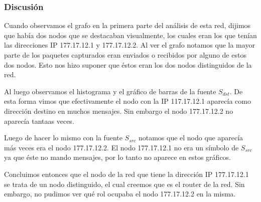 \subsubsection{Discusión}

Cuando observamos el grafo en la primera parte del análisis de esta red, dijimos que había dos nodos que se destacaban visualmente, los cuales eran los que tenían las direcciones IP 177.17.12.1 y 177.17.12.2. Al ver el grafo notamos que la mayor parte de los paquetes capturados eran enviados o recibidos por alguno de estos dos nodos. Esto nos hizo suponer que éstos eran los dos nodos distinguidos de la red.

Al luego observamos el histograma y el gráfico de barras de la fuente $S_{dst}$. De esta forma vimos que efectivamente el nodo con la IP 117.17.12.1 aparecía como dirección destino en muchos mensajes. Sin embargo el nodo 177.17.12.2 no aparecía tantaas veces.

Luego de hacer lo mismo con la fuente $S_{src}$ notamos que el nodo que aparecía más veces era el nodo 177.17.12.2. El nodo 177.17.12.1 no era un símbolo de $S_{src}$ ya que éste no mando mensajes, por lo tanto no aparece en estos gráficos.

Concluimos entonces que el nodo de la red que tiene la dirección IP 177.17.12.1 se trata de un nodo distinguido, el cual creemos que es el router de la red. Sin embargo, no pudimos ver qué rol ocupaba el nodo 177.17.12.2 en la misma.